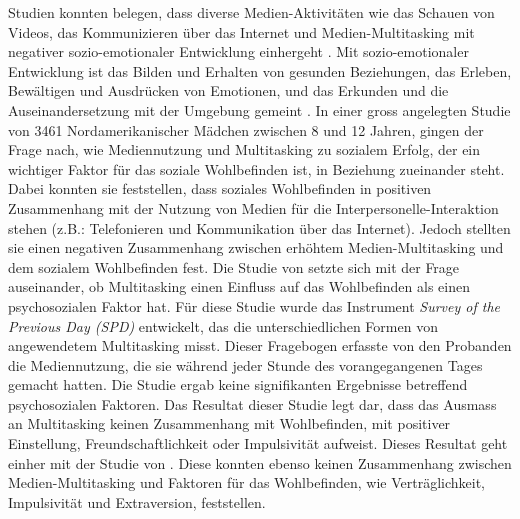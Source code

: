 Studien konnten belegen, dass diverse Medien-Aktivitäten wie das Schauen von Videos, das Kommunizieren über das Internet und Medien-Multitasking mit negativer sozio-emotionaler Entwicklung einhergeht \cite{Funk1996, Rideout2010, Pea2012}. Mit sozio-emotionaler Entwicklung ist das Bilden und Erhalten von gesunden Beziehungen, das Erleben, Bewältigen und Ausdrücken von Emotionen, und das Erkunden und die Auseinandersetzung mit der Umgebung gemeint \cite{Hymes1952, Lerner2000}. In einer gross angelegten Studie von 3461 Nordamerikanischer Mädchen zwischen 8 und 12 Jahren, gingen  der Frage nach, wie Mediennutzung und Multitasking zu sozialem Erfolg, der ein wichtiger Faktor für das soziale Wohlbefinden ist, in Beziehung zueinander steht. Dabei konnten sie feststellen, dass soziales Wohlbefinden in positiven Zusammenhang mit der Nutzung von Medien für die Interpersonelle-Interaktion stehen (z.B.: Telefonieren und Kommunikation über das Internet). Jedoch stellten sie einen negativen Zusammenhang zwischen erhöhtem Medien-Multitasking und dem sozialem Wohlbefinden fest. Die Studie von  setzte sich mit der Frage auseinander, ob Multitasking einen Einfluss auf das Wohlbefinden als einen psychosozialen Faktor hat. Für diese Studie wurde das Instrument \textit{Survey of the Previous Day (SPD)} entwickelt, das die unterschiedlichen Formen von angewendetem Multitasking misst. Dieser Fragebogen erfasste von den Probanden die Mediennutzung, die sie während jeder Stunde des vorangegangenen Tages gemacht hatten. Die Studie ergab keine signifikanten Ergebnisse betreffend psychosozialen Faktoren. Das Resultat dieser Studie legt dar, dass das Ausmass an Multitasking keinen Zusammenhang mit Wohlbefinden, mit positiver Einstellung, Freundschaftlichkeit oder Impulsivität aufweist. Dieses Resultat geht einher mit der Studie von . Diese konnten ebenso keinen Zusammenhang zwischen Medien-Multitasking und Faktoren für das Wohlbefinden, wie Verträglichkeit, Impulsivität und Extraversion, feststellen.


